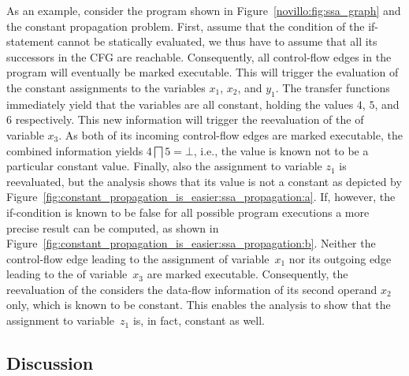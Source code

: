 \smallskip
As an example, consider the program shown in Figure~\ref{novillo:fig:ssa_graph} and the constant propagation problem. 
First, assume that the condition of the if-statement cannot be statically evaluated, we thus have to assume that all its successors in the CFG are reachable. 
Consequently, all control-flow edges in the program will eventually be marked executable. 
This will trigger the evaluation of the constant assignments to the variables $x_1$, $x_2$, and $y_1$. 
The transfer functions immediately yield that the variables are all constant, holding the values $4$, $5$, and $6$ respectively. 
This new information will trigger the reevaluation of the \phifun of variable $x_3$. As both of its incoming control-flow edges
are marked executable, the combined information yields $4 \bigsqcap 5 = \bot$, i.e., the value is known not to be a particular constant value. 
Finally, also the assignment to variable $z_1$ is reevaluated, but the analysis shows that its value is not a constant as depicted by Figure~\ref{fig:constant_propagation_is_easier:ssa_propagation:a}. 
If, however, the if-condition is known to be false for all possible program executions a more precise result can be computed, as shown in Figure~\ref{fig:constant_propagation_is_easier:ssa_propagation:b}. 
Neither the control-flow edge leading to the assignment of variable~$x_1$ nor its outgoing edge leading to the \phifun of variable~$x_3$ are marked executable. 
Consequently, the reevaluation of the \phifun considers the data-flow information of its second operand $x_2$ only, which is known to be constant. 
This enables the analysis to show that the assignment to variable~$z_1$ is, in fact, constant as well.

\subsection{Discussion}

